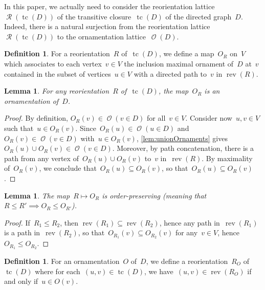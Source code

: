 \documentclass{amsart}
\newtheorem{lemma}[theorem]{Lemma}
\theoremstyle{definition}
\newtheorem{definition}[theorem]{Definition}
\renewcommand{\c}[1]{\mathcal{#1}} %
\DeclareMathOperator{\tc}{tc} %
\DeclareMathOperator{\Orn}{\c{O}}  %
\DeclareMathOperator{\Reori}{\c{R}}  %
\DeclareMathOperator{\rev}{rev} %
\begin{document}
In this paper, we actually need to consider the reorientation lattice~$\Reori(\tc(D))$ of the transitive closure~$\tc(D)$ of the directed graph~$D$.
Indeed, there is a natural surjection from the reorientation lattice~$\Reori(\tc(D))$ to the ornamentation lattice~$\Orn(D)$.

\begin{definition}
\label{def:Reori2Orn}
For a reorientation~$R$ of~$\tc(D)$, we define a map~$O_{\!R}$ on~$V$ which associates to each vertex~$v \in V$ the inclusion maximal ornament of~$D$ at~$v$ contained in the subset of vertices~$u \in V$ with a directed path to~$v$ in $\rev(R)$.
\end{definition}

\begin{lemma}
\label{lem:Reori2Orn1}
For any reorientation~$R$ of~$\tc(D)$, the map~$O_{\!R}$ is an ornamentation of~$D$.
\end{lemma}

\begin{proof}
By definition, $O_{\!R}(v) \in \Orn(v \in D)$ for all~$v \in V$.
Consider now~$u,v \in V$ such that~$u \in O_{\!R}(v)$.
Since~$O_{\!R}(u) \in \Orn(u \in D)$ and~$O_{\!R}(v) \in \Orn(v \in D)$ with~${u \in O_{\!R}(v)}$, \cref{lem:unionOrnaments} gives~$O_{\!R}(u) \cup O_{\!R}(v) \in \Orn(v \in D)$.
Moreover, by path concatenation, there is a path from any vertex of~$O_{\!R}(u) \cup O_{\!R}(v)$ to~$v$ in~$\rev(R)$.
By maximality of~$O_{\!R}(v)$, we conclude that~$O_{\!R}(u) \subseteq O_{\!R}(v)$, so that~$O_{\!R}(u) \subseteq O_{\!R}(v)$.
\end{proof}

\begin{lemma}
\label{lem:Reori2Orn2}
The map~$R \mapsto O_{\!R}$ is order-preserving (meaning that~$R \le R' \implies O_{\!R} \le O_{\!R'}$).
\end{lemma}

\begin{proof}
If~$R_1 \le R_2$, then $\rev(R_1) \subseteq \rev(R_2)$, hence any path in~$\rev(R_1)$ is a path in~$\rev(R_2)$, so that~$O_{\!R_1}(v) \subseteq O_{\!R_2}(v)$ for any~$v \in V$, hence~$O_{\!R_1} \le O_{\!R_2}$.
\end{proof}

\begin{definition}
For an ornamentation~$O$ of~$D$, we define a reorientation~$R_O$ of~$\tc(D)$ where for each~$(u,v) \in \tc(D)$, we have~$(u,v) \in \rev(R_O)$ if and only if~$u \in O(v)$.
\end{definition}
\end{document}
